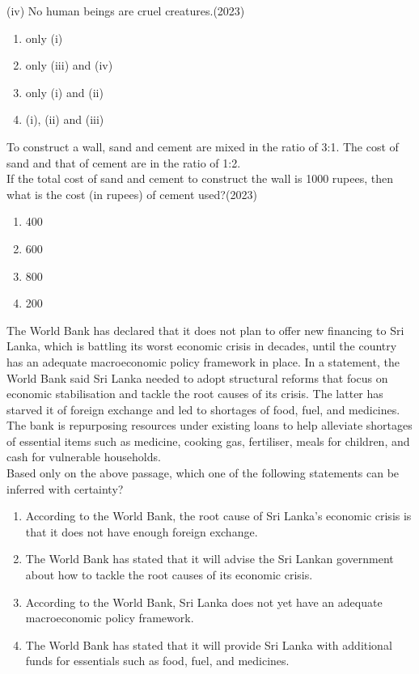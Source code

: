     (iv) No human beings are cruel creatures.\hfill (2023)\\
    \begin{enumerate}[label = (\Alph*)]
        \item only (i)
        \item only (iii) and (iv)
        \item only (i) and (ii) 
        \item (i), (ii) and (iii)
    \end{enumerate}
    \item[7.] To construct a wall, sand and cement are mixed in the ratio of 3:1. The cost of sand
    and that of cement are in the ratio of 1:2. \\
    If the total cost of sand and cement to construct the wall is 1000 rupees, then what
    is the cost (in rupees) of cement used?\hfill (2023)
    \begin{enumerate}[label = (\Alph*)]
        \item 400
        \item 600
        \item 800
        \item 200
    \end{enumerate}
    \item[8.] The World Bank has declared that it does not plan to offer new financing to Sri
    Lanka, which is battling its worst economic crisis in decades, until the country has
    an adequate macroeconomic policy framework in place. In a statement, the World
    Bank said Sri Lanka needed to adopt structural reforms that focus on economic
    stabilisation and tackle the root causes of its crisis. The latter has starved it of
    foreign exchange and led to shortages of food, fuel, and medicines. The bank is
    repurposing resources under existing loans to help alleviate shortages of essential
    items such as medicine, cooking gas, fertiliser, meals for children, and cash for
    vulnerable households.\\
    Based only on the above passage, which one of the following statements can be
    inferred with certainty?
    \begin{enumerate}[label = (\Alph*)]
        \item According to the World Bank, the root cause of Sri Lanka’s economic crisis is that
        it does not have enough foreign exchange.
        \item The World Bank has stated that it will advise the Sri Lankan government about how
        to tackle the root causes of its economic crisis.
        \item According to the World Bank, Sri Lanka does not yet have an adequate
        macroeconomic policy framework.
        \item The World Bank has stated that it will provide Sri Lanka with additional funds for
        essentials such as food, fuel, and medicines.
    \end{enumerate}
